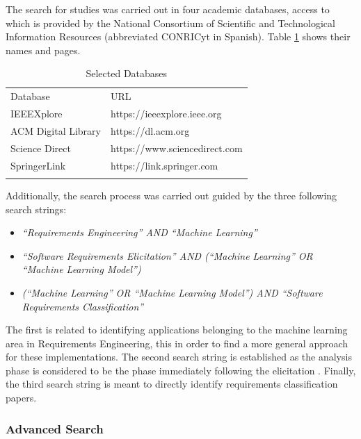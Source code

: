 \documentclass[conference]{IEEEtran}
\newcommand{\quotes}[1]{``#1''}
\begin{document}
The search for studies was carried out in four academic databases, access to which is provided by the National Consortium of Scientific and Technological Information Resources (abbreviated CONRICyt in Spanish). Table \ref{tab:selected-databases} shows their names and pages.

\begin{table}[!htbp]
    \caption{Selected Databases}
    \label{tab:selected-databases}       %
    \begin{tabular}{p{4cm}p{4cm}}
        \hline\noalign{\smallskip}
        Database & URL  \\
        \noalign{\smallskip}\hline\noalign{\smallskip}
        IEEEXplore & https://ieeexplore.ieee.org \\
        ACM Digital Library & https://dl.acm.org \\
        Science Direct & https://www.sciencedirect.com \\
        SpringerLink & https://link.springer.com \\
        \noalign{\smallskip}\hline
    \end{tabular}
\end{table}

Additionally, the search process was carried out guided by the three following search strings: 

\begin{itemize}
  \item\textit{\quotes{Requirements Engineering} AND \quotes{Machine Learning}}
  \item\textit{\quotes{Software Requirements Elicitation} AND (\quotes{Machine Learning} OR \quotes{Machine Learning Model})}
  \item\textit{(\quotes{Machine Learning} OR \quotes{Machine Learning Model}) AND \quotes{Software Requirements Classification}}
\end{itemize}

The first is related to identifying applications belonging to the machine learning area in Requirements Engineering, this in order to find a more general approach for these implementations. The second search string is established as the analysis phase is considered to be the phase immediately following the elicitation \cite{Wiegers2013}. Finally, the third search string is meant to directly identify requirements classification papers.

\subsubsection{Advanced Search}
\end{document}
